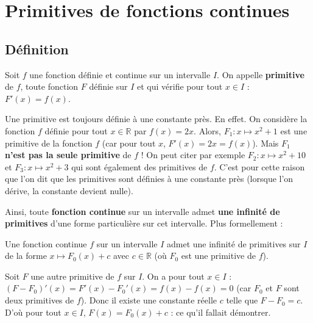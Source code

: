 



	\section{Primitives de fonctions continues}

	\subsection{Définition}

	\begin{formula}[Définition]
		Soit $f$ une fonction définie et continue sur un intervalle $I$. On appelle \textbf{primitive} de $f$, toute fonction $F$ définie sur $I$ et qui vérifie pour tout $x \in I$ : $F'(x) = f(x)$.
	\end{formula}

	\begin{tip}[Note]
		Une primitive est toujours définie à une constante près.
		\newpar
		En effet. On considère la fonction $f$ définie pour tout $x \in \mathbb{R}$ par $f(x) = 2x$. Alors, $F_{1} : x \mapsto x^2 + 1$ est une primitive de la fonction $f$ (car pour tout $x$, $F'(x) = 2x = f(x)$).
		\newpar
		Mais $F_{1}$ \textbf{n'est pas la seule primitive} de $f$ ! On peut citer par exemple $F_{2} : x \mapsto x^2 + 10$ et $F_{3} : x \mapsto x^2 + 3$ qui sont également des primitives de $f$.
		\newpar
		C'est pour cette raison que l'on dit que les primitives sont définies à une constante près (lorsque l'on dérive, la constante devient nulle).
	\end{tip}

	Ainsi, toute \textbf{fonction continue} sur un intervalle admet \textbf{une infinité de primitives} d'une forme particulière sur cet intervalle. Plus formellement :

	\begin{formula}
		Une fonction continue $f$ sur un intervalle $I$ admet une infinité de primitives sur $I$ de la forme $x \mapsto F_0(x) + c$ avec $c \in \mathbb{R}$ (où $F_0$ est une primitive de $f$).
	\end{formula}

	\begin{demonstration}
		Soit $F$ une autre primitive de $f$ sur $I$. On a pour tout $x \in I$ :
		\newpar
		$(F - F_0)'(x) = F'(x) - F_0'(x) = f(x) - f(x) = 0$ (car $F_0$ et $F$ sont deux primitives de $f$).
		\newpar
		Donc il existe une constante réelle $c$ telle que $F - F_0 = c$. D'où pour tout $x \in I$, $F(x) = F_0(x) + c$ : ce qu'il fallait démontrer.
	\end{demonstration}

